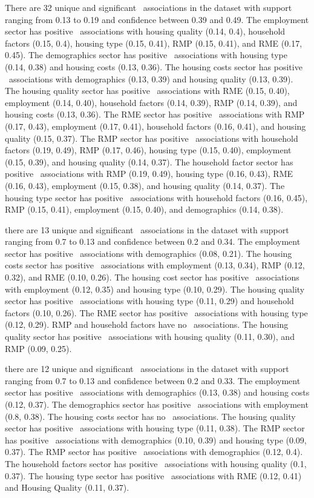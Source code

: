 There are 32 unique and significant \llr~associations in the dataset with support ranging from 0.13  to 0.19 and confidence between 0.39 and 0.49. The employment sector has positive \hhr~associations with housing quality (0.14, 0.4), household factors (0.15, 0.4), housing type (0.15, 0.41), RMP (0.15, 0.41), and RME (0.17, 0.45). The demographics sector has positive \hhr~associations with housing type (0.14, 0.38) and housing costs (0.13, 0.36). The housing costs sector has positive \hhr~associations with demographics (0.13, 0.39) and housing quality (0.13, 0.39). The housing quality sector has positive \hhr~associations with RME (0.15, 0.40), employment (0.14, 0.40), household factors (0.14, 0.39), RMP (0.14, 0.39), and housing costs (0.13, 0.36). The RME sector has positive \hhr~associations with RMP (0.17, 0.43), employment (0.17, 0.41), household factors (0.16, 0.41), and housing quality (0.15, 0.37). The RMP sector has positive \hhr~associations with household factors (0.19, 0.49), RMP (0.17, 0.46), housing type (0.15, 0.40),  employment (0.15, 0.39), and housing quality (0.14, 0.37). The household factor sector has positive \hhr~associations with RMP (0.19, 0.49), housing type (0.16, 0.43), RME (0.16, 0.43), employment (0.15, 0.38), and housing quality (0.14, 0.37). The housing type sector has positive \hhr~associations with household factors (0.16, 0.45), RMP (0.15, 0.41), employment (0.15, 0.40), and demographics (0.14, 0.38).

there are 13 unique and significant \lhr~associations in the dataset with support ranging from 0.7 to 0.13 and confidence between 0.2 and 0.34. The employment sector has positive \lhr~associations with demographics (0.08, 0.21). The housing costs sector has positive \lhr~associations with employment (0.13, 0.34), RMP (0.12, 0.32), and RME (0.10, 0.26). The housing cost sector has positive \lhr~associations with employment (0.12, 0.35) and housing type (0.10, 0.29). The housing quality sector has positive \lhr~associations with housing type (0.11, 0.29) and household factors (0.10, 0.26). The RME sector has positive \lhr~associations with housing type (0.12, 0.29). RMP and household factors have no \lhr~associations. The housing quality sector has positive \lhr~associations with housing quality (0.11, 0.30), and RMP (0.09, 0.25).

there are 12 unique and significant \hlr~associations in the dataset with support ranging from 0.7 to 0.13 and confidence between 0.2 and 0.33. The employment sector has positive \hlr~associations with demographics (0.13, 0.38) and housing costs (0.12, 0.37). The demographics sector has positive \hlr~associations with employment (0.8, 0.38). The housing costs sector has no \hlr~associations. The housing quality sector has positive \hlr~associations with housing type (0.11, 0.38). The RMP sector has positive \hlr~associations with demographics (0.10, 0.39) and housing type (0.09, 0.37). The RMP sector has positive \hlr~associations with demographics (0.12, 0.4). The household factors sector has positive \hlr~associations with housing quality (0.1, 0.37). The housing type sector has positive \hlr~associations with RME (0.12, 0.41) and Housing Quality (0.11, 0.37).


